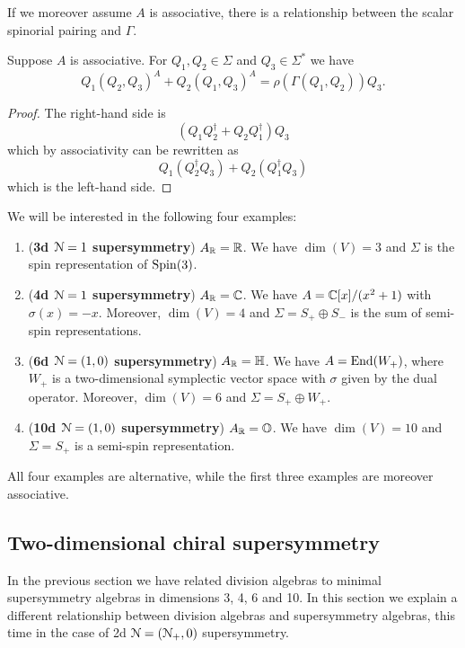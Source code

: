 \documentclass[10pt, oneside]{article}
\begin{document}
If we moreover assume $A$ is associative, there is a relationship between the scalar spinorial pairing and $\Gamma$.

\begin{thm}
Suppose $A$ is associative. For $Q_1, Q_2\in\Sigma$ and $Q_3\in\Sigma^*$ we have
\[Q_1(Q_2, Q_3)^A + Q_2(Q_1, Q_3)^A = \rho(\Gamma(Q_1, Q_2)) Q_3.\]
\label{thm:matter3psi}
\end{thm}
\begin{proof}
The right-hand side is
\[(Q_1Q_2^\dagger + Q_2Q_1^\dagger)Q_3\]
which by associativity can be rewritten as
\[Q_1(Q_2^\dagger Q_3) + Q_2(Q_1^\dagger Q_3)\]
which is the left-hand side.
\end{proof}

We will be interested in the following four examples:
\begin{enumerate}
\item (\textbf{3d $\mathcal{N}=1$ supersymmetry}) $A_\mathbb R = \mathbb R$. We have $\dim(V) = 3$ and $\Sigma$ is the spin representation of $\mathrm{Spin}(3)$.

\item (\textbf{4d $\mathcal{N}=1$ supersymmetry}) $A_\mathbb R = \mathbb C$. We have $A = \mathbb C[x]/(x^2+1)$ with $\sigma(x) = -x$. Moreover, $\dim(V) = 4$ and $\Sigma=S_+\oplus S_-$ is the sum of semi-spin representations.

\item (\textbf{6d $\mathcal{N}=(1, 0)$ supersymmetry}) $A_\mathbb R = \mathbb{H}$. We have $A=\operatorname{End}(W_+)$, where $W_+$ is a two-dimensional symplectic vector space with $\sigma$ given by the dual operator. Moreover, $\dim(V) = 6$ and $\Sigma = S_+\oplus W_+$.

\item (\textbf{10d $\mathcal{N}=(1, 0)$ supersymmetry}) $A_\mathbb R = \mathbb{O}$. We have $\dim(V) = 10$ and $\Sigma = S_+$ is a semi-spin representation.
\end{enumerate}

All four examples are alternative, while the first three examples are moreover associative.

\subsection{Two-dimensional chiral supersymmetry}

In the previous section we have related division algebras to minimal supersymmetry algebras in dimensions 3, 4, 6 and 10. In this section we explain a different relationship between division algebras and supersymmetry algebras, this time in the case of 2d $\mathcal N=(\mathcal N_+, 0)$ supersymmetry.
\end{document}
